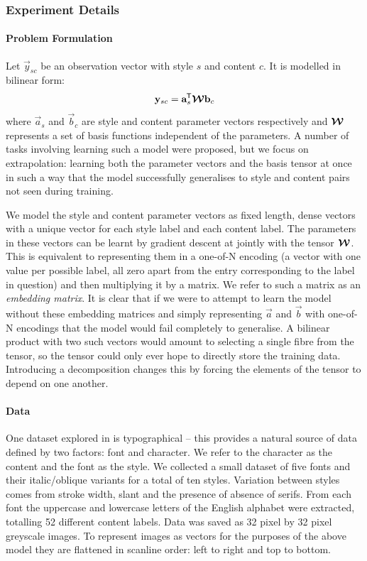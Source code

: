 \subsubsection{Experiment Details}
\paragraph{Problem Formulation}
Let \(\vec{y}_{sc}\) be an observation vector with style \(s\) and content \(c\). It is modelled
in bilinear form:
\begin{equation}
	\mathbf{y}_{sc} = \mathbf{a}_s^{\mkern-1.5mu\mathsf{T}}\bm{\mathcal{W}}\mathbf{b}_c
\end{equation} where \(\vec{a}_s\) and \(\vec{b}_c\) are style and content parameter vectors
respectively and \(\bm{\mathcal{W}}\) represents a set of basis functions independent of the parameters.
A number of tasks involving learning such a model were proposed, but we focus on extrapolation:
 learning both the parameter vectors and the basis tensor at once in such a way that
the model successfully generalises to style and content pairs not seen during training.

We model the style and content parameter vectors as fixed length, dense vectors with a unique
vector for each style label and each content label. The parameters in these vectors can be
learnt by gradient descent at jointly with the tensor \(\bm{\mathcal{W}}\). This is equivalent
to representing them in a one-of-N encoding (a vector with one value per possible label, all
zero apart from the entry corresponding to the label in question) and then multiplying it by
a matrix. We refer to such a matrix as an \textit{embedding matrix}. It is clear that if we
were to attempt to learn the model without these embedding matrices and simply representing
\(\vec{a}\) and \(\vec{b}\) with one-of-N encodings that the model would fail completely to
generalise. A bilinear product with two such vectors would amount to selecting a single fibre
from the tensor, so the tensor could only ever hope to directly store the training data.
Introducing a decomposition changes this by forcing the elements of the tensor to depend on
one another.


\paragraph{Data}
One dataset explored in \autocite{Tenenbaum2000} is typographical -- this provides a natural
source of data defined by two factors: font and character. We refer to the character as the
content and the font as the style. We collected a small dataset of five fonts and their
italic/oblique variants for a total of ten styles. Variation between styles comes from stroke
width, slant and the presence of absence of serifs. From each font the uppercase and lowercase
letters of the English alphabet were extracted, totalling 52 different content labels. Data was
saved as 32 pixel by 32 pixel greyscale images. To represent images as vectors for the purposes
of the above model they are flattened in scanline order: left to right and top to bottom.

